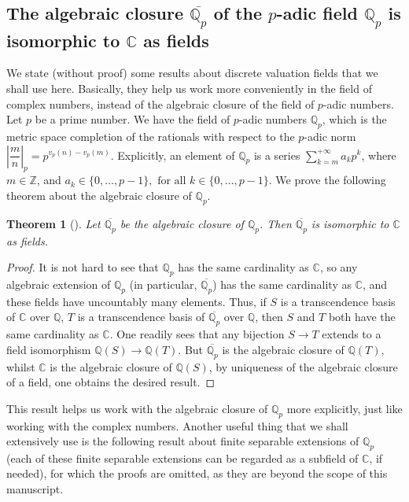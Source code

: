 \documentclass[12pt,a4paper]{report}
\newtheorem{theorem}{Theorem}[chapter]
\theoremstyle{definition}
\theoremstyle{remark}
\theoremstyle{definition}
\begin{document}
\subsection{The algebraic closure $\overline{\mathbb{Q}_p}$ of the $p$-adic field $\mathbb{Q}_p$ is isomorphic to $\mathbb{C}$ as fields}
We state (without proof) some results about discrete valuation fields that we shall use here. Basically, they help us work more conveniently in the field of complex numbers, instead of the algebraic closure of the field of $p$-adic numbers. \smallbreak
Let $p$ be a prime number. We have the field of $p$-adic numbers $\mathbb{Q}_p$, which is the metric space completion of the rationals with respect to the $p$-adic norm $\left|\dfrac{m}{n}\right|_p = p^{v_p(n) - v_p(m)}$. Explicitly, an element of $\mathbb{Q}_p$ is a series $\sum\limits_{k = m}^{+\infty}a_k p^k$, where $m\in \mathbb{Z}$, and $a_k\in \{0, \ldots, p-1\}, \text{ for all } k\in \{0, \ldots, p-1\}$. We prove the following theorem about the algebraic closure of $\mathbb{Q}_p$.
\begin{theorem}[{\cite[Remark 9.17]{milne_fields_galois}}]\label{thm: Q_p and C are the same}
Let $\overline{\mathbb{Q}_p}$ be the algebraic closure of $\mathbb{Q}_p$. Then $\overline{\mathbb{Q}_p}$ is isomorphic to $\mathbb{C}$ as fields.
\end{theorem}
\begin{proof}
    It is not hard to see that $\mathbb{Q}_p$ has the same cardinality as $\mathbb{C}$, so any algebraic extension of $\mathbb{Q}_p$ (in particular, $\overline{\mathbb{Q}_p}$) has the same cardinality as $\mathbb{C}$, and these fields have uncountably many elements. Thus, if $S$ is a transcendence basis of $\mathbb{C}$ over $\mathbb{Q}$, $T$ is a transcendence basis of $\overline{\mathbb{Q}_p}$ over $\mathbb{Q}$, then $S$ and $T$ both have the same cardinality as $\mathbb{C}$. One readily sees that any bijection $S\to T$ extends to a field isomorphism $\mathbb{Q}(S) \to \mathbb{Q}(T)$. But $\overline{\mathbb{Q}_p}$ is the algebraic closure of $\mathbb{Q}(T)$, whilst $\mathbb{C}$ is the algebraic closure of $\mathbb{Q}(S)$, by uniqueness of the algebraic closure of a field, one obtains the desired result.   
\end{proof}
This result helps us work with the algebraic closure of $\mathbb{Q}_p$ more explicitly, just like working with the complex numbers. Another useful thing that we shall extensively use is the following result about finite separable extensions of $\mathbb{Q}_p$ (each of these finite separable extensions can be regarded as a subfield of $\mathbb{C}$, if needed), for which the proofs are omitted, as they are beyond the scope of this manuscript.
\end{document}

